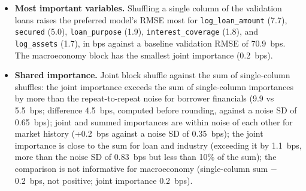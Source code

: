 \documentclass[9pt,letterpaper]{extarticle}
\begin{document}
\begin{itemize}
  \item \textbf{Most important variables.} Shuffling a single column of the validation loans raises the preferred model's RMSE most for \mbox{\texttt{log\_loan\_amount}} (7.7), \mbox{\texttt{secured}} (5.0), \mbox{\texttt{loan\_purpose}} (1.9), \mbox{\texttt{interest\_coverage}} (1.8), and \mbox{\texttt{log\_assets}} (1.7), in bps against a baseline validation RMSE of 70.9~bps. The macroeconomy block has the smallest joint importance (0.2~bps).
  \item \textbf{Shared importance.} Joint block shuffle against the sum of single-column shuffles: the joint importance exceeds the sum of single-column importances by more than the repeat-to-repeat noise for borrower financials (9.9 vs 5.5~bps; difference 4.5~bps, computed before rounding, against a noise SD of 0.65~bps); joint and summed importances are within noise of each other for market history (+0.2~bps against a noise SD of 0.35~bps); the joint importance is close to the sum for loan and industry (exceeding it by 1.1~bps, more than the noise SD of 0.83~bps but less than 10\% of the sum); the comparison is not informative for macroeconomy (single-column sum $-$0.2~bps, not positive; joint importance 0.2~bps).
\end{itemize}
\end{document}
